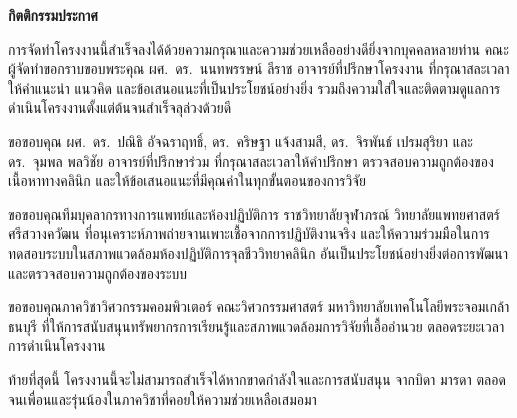\clearpage
{}
{}

\begin{center}\textbf{กิตติกรรมประกาศ}\end{center}

\hspace{\parindent}%
การจัดทำโครงงานนี้สำเร็จลงได้ด้วยความกรุณาและความช่วยเหลืออย่างดียิ่งจากบุคคลหลายท่าน
คณะผู้จัดทำขอกราบขอบพระคุณ ผศ.\ ดร.\ นนทพรรษน์ ลีราช อาจารย์ที่ปรึกษาโครงงาน
ที่กรุณาสละเวลาให้คำแนะนำ แนวคิด และข้อเสนอแนะที่เป็นประโยชน์อย่างยิ่ง
รวมถึงความใส่ใจและติดตามดูแลการดำเนินโครงงานตั้งแต่ต้นจนสำเร็จลุล่วงด้วยดี

ขอขอบคุณ ผศ.\ ดร.\ ปณิธิ อัจฉราฤทธิ์, ดร.\ คริษฐา แจ้งสามสี,
ดร.\ จิรพันธ์ เปรมสุริยา และ ดร.\ จุมพล พลวิชัย
อาจารย์ที่ปรึกษาร่วม ที่กรุณาสละเวลาให้คำปรึกษา
ตรวจสอบความถูกต้องของเนื้อหาทางคลินิก และให้ข้อเสนอแนะที่มีคุณค่าในทุกขั้นตอนของการวิจัย

ขอขอบคุณทีมบุคลากรทางการแพทย์และห้องปฏิบัติการ
ราชวิทยาลัยจุฬาภรณ์ วิทยาลัยแพทยศาสตร์ศรีสวางควัฒน
ที่อนุเคราะห์ภาพถ่ายจานเพาะเชื้อจากการปฏิบัติงานจริง
และให้ความร่วมมือในการทดสอบระบบในสภาพแวดล้อมห้องปฏิบัติการจุลชีววิทยาคลินิก
อันเป็นประโยชน์อย่างยิ่งต่อการพัฒนาและตรวจสอบความถูกต้องของระบบ

ขอขอบคุณภาควิชาวิศวกรรมคอมพิวเตอร์ คณะวิศวกรรมศาสตร์
มหาวิทยาลัยเทคโนโลยีพระจอมเกล้าธนบุรี
ที่ให้การสนับสนุนทรัพยากรการเรียนรู้และสภาพแวดล้อมการวิจัยที่เอื้ออำนวย
ตลอดระยะเวลาการดำเนินโครงงาน

ท้ายที่สุดนี้ โครงงานนี้จะไม่สามารถสำเร็จได้หากขาดกำลังใจและการสนับสนุน
จากบิดา มารดา ตลอดจนเพื่อนและรุ่นน้องในภาควิชาที่คอยให้ความช่วยเหลือเสมอมา

\newpage

